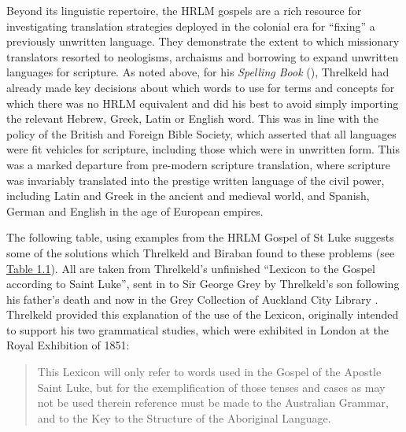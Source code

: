 {Beyond its linguistic repertoire, the HRLM gospels are a rich resource for investigating translation strategies deployed in the colonial era for “fixing” a previously unwritten language. They demonstrate the extent to which missionary translators resorted to neologisms, archaisms and borrowing to expand unwritten languages for scripture. As noted above, for his \textit{Spelling Book} (\citeyear{threlkeld_australian_1836}), Threlkeld had already made key decisions about which words to use for terms and concepts for which there was no HRLM equivalent and did his best to avoid simply importing the relevant Hebrew, Greek, Latin or English word. This was in line with the policy of the British and Foreign Bible Society, which asserted that all languages were fit vehicles for scripture, including those which were in unwritten form. This was a marked departure from pre-modern scripture translation, where scripture was invariably translated into the prestige written language of the civil power, including Latin and Greek in the ancient and medieval world, and Spanish, German and English in the age of European empires. 

The following table, using examples from the HRLM Gospel of St Luke suggests some of the solutions which Threlkeld and Biraban found to these problems (see \hyperref[tab:1.1]{Table 1.1}). All are taken from Threlkeld’s unfinished “Lexicon to the Gospel according to Saint Luke”, sent in \citeyear{threlkeld_aboriginal_1859} to Sir George Grey by Threlkeld’s son following his father’s death and now in the Grey Collection of Auckland City Library \citep{threlkeld_aboriginal_1859}. Threlkeld provided this explanation of the use of the Lexicon, originally intended to support his two grammatical studies, which were exhibited in London at the Royal Exhibition of 1851:

\begin{quote}
     This Lexicon will only refer to words used in the Gospel of the Apostle Saint Luke, but for the exemplification of those tenses and cases as may not be used therein reference must be made to the Australian Grammar, and to the Key to the Structure of the Aboriginal Language.
\end{quote}

}
